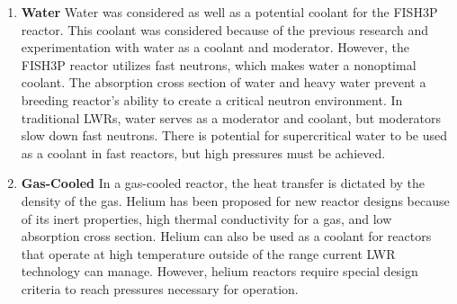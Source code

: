 \documentclass[12pt]{article}
\begin{document}
\begin{enumerate}
\item \textbf{Water} \newline
	Water was considered as well as a potential coolant for the FISH3P reactor.  This coolant was considered because of the previous research and experimentation with water as a coolant and moderator.  However, the FISH3P reactor utilizes fast neutrons, which makes water a nonoptimal coolant.  The absorption cross section of water and heavy water prevent a breeding reactor’s ability to create a critical neutron environment.  In traditional LWRs, water serves as a moderator and coolant, but moderators slow down fast neutrons.  There is potential for supercritical water to be used as a coolant in fast reactors, but high pressures must be achieved.  
\item \textbf{Gas-Cooled} \newline
	In a gas-cooled reactor, the heat transfer is dictated by the density of the gas.   Helium has been proposed for new reactor designs because of its inert properties, high thermal conductivity for a gas, and low absorption cross section.  Helium can also be used as a coolant for reactors that operate at high temperature outside of the range current LWR technology can manage.  However, helium reactors require special design criteria to reach pressures necessary for operation.
\end{enumerate}
\end{document}
